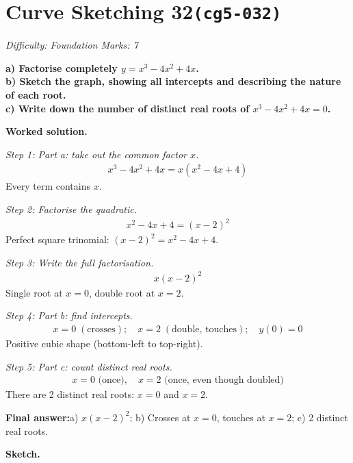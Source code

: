 \documentclass[11pt]{article}
\newcommand{\question}[1]{\par\medskip\noindent\textbf{#1}\par}
\begin{document}
\section*{Curve Sketching 32\quad\small\texttt{(cg5-032)}}
\textit{Difficulty: Foundation \quad\textbar\quad Marks: 7}

\question{a) Factorise completely \( y = x^3 - 4x^2 + 4x \). \\[3pt] b) Sketch the graph, showing all intercepts and describing the nature of each root. \\[3pt] c) Write down the number of distinct real roots of \( x^3 - 4x^2 + 4x = 0 \).}

\textbf{Worked solution.}

\textit{Step 1: Part a: take out the common factor \( x \).}
\[\begin{gathered}
x^3 - 4x^2 + 4x = x(x^2 - 4x + 4)
\end{gathered}\]
Every term contains \( x \).

\textit{Step 2: Factorise the quadratic.}
\[\begin{gathered}
x^2 - 4x + 4 = (x - 2)^2
\end{gathered}\]
Perfect square trinomial: \( (x-2)^2 = x^2 - 4x + 4 \).

\textit{Step 3: Write the full factorisation.}
\[\begin{gathered}
x(x-2)^2
\end{gathered}\]
Single root at \( x = 0 \), double root at \( x = 2 \).

\textit{Step 4: Part b: find intercepts.}
\[\begin{gathered}
x = 0 \;(\text{crosses}); \quad x = 2 \;(\text{double, touches}); \quad y(0) = 0
\end{gathered}\]
Positive cubic shape (bottom-left to top-right).

\textit{Step 5: Part c: count distinct real roots.}
\[\begin{gathered}
x = 0 \text{ (once)}, \quad x = 2 \text{ (once, even though doubled)}
\end{gathered}\]
There are 2 distinct real roots: \( x = 0 \) and \( x = 2 \).

\begin{answerbox}
\textbf{Final answer:}\quad a) \(\displaystyle x(x-2)^2\); b) Crosses at \(\displaystyle x = 0\), touches at \(\displaystyle x = 2\); c) 2 distinct real roots.
\end{answerbox}
\textbf{Sketch.}
\end{document}
